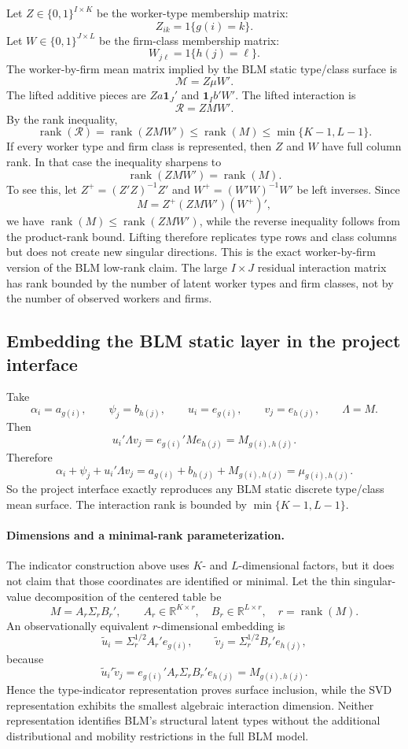 \documentclass[11pt]{article}
\newcommand{\R}{\mathbb{R}}
\newcommand{\rank}{\operatorname{rank}}
\newcommand{\one}{\mathbf{1}}
\begin{document}
Let \(Z\in\{0,1\}^{I\times K}\) be the worker-type membership matrix:
\[
Z_{ik}=1\{g(i)=k\}.
\]
Let \(W\in\{0,1\}^{J\times L}\) be the firm-class membership matrix:
\[
W_{j\ell}=1\{h(j)=\ell\}.
\]
The worker-by-firm mean matrix implied by the BLM static type/class surface is
\[
\mathcal{M}=Z\mu W'.
\tag{lifted-mean}
\]
The lifted additive pieces are \(Za\one_J'\) and \(\one_I b'W'\). The lifted
interaction is
\[
\mathcal{R}=ZMW'.
\tag{lifted-interaction}
\]
By the rank inequality,
\[
\rank(\mathcal{R})
=
\rank(ZMW')
\leq
\rank(M)
\leq
\min\{K-1,L-1\}.
\tag{lifted-rank}
\]
If every worker type and firm class is represented, then \(Z\) and \(W\) have
full column rank.  In that case the inequality sharpens to
\[
\rank(ZMW')=\rank(M).
\tag{lifted-rank-equality}
\]
To see this, let \(Z^+=(Z'Z)^{-1}Z'\) and \(W^+=(W'W)^{-1}W'\) be left
inverses.  Since
\[
M=Z^+(ZMW')(W^+)',
\]
we have \(\rank(M)\leq\rank(ZMW')\), while the reverse inequality follows
from the product-rank bound.  Lifting therefore replicates type rows and class
columns but does not create new singular directions.
This is the exact worker-by-firm version of the BLM low-rank claim. The large
\(I\times J\) residual interaction matrix has rank bounded by the number of
latent worker types and firm classes, not by the number of observed workers and
firms.

\subsection{Embedding the BLM static layer in the project interface}

Take
\[
\alpha_i=a_{g(i)},
\qquad
\psi_j=b_{h(j)},
\qquad
u_i=e_{g(i)},
\qquad
v_j=e_{h(j)},
\qquad
\Lambda=M.
\]
Then
\[
u_i'\Lambda v_j
=
e_{g(i)}'M e_{h(j)}
=
M_{g(i),h(j)}.
\]
Therefore
\[
\alpha_i+\psi_j+u_i'\Lambda v_j
=
a_{g(i)}+b_{h(j)}+M_{g(i),h(j)}
=
\mu_{g(i),h(j)}.
\]
So the project interface exactly reproduces any BLM static discrete
type/class mean surface. The interaction rank is bounded by
\(\min\{K-1,L-1\}\).

\paragraph{Dimensions and a minimal-rank parameterization.}
The indicator construction above uses \(K\)- and \(L\)-dimensional factors,
but it does not claim that those coordinates are identified or minimal.  Let
the thin singular-value decomposition of the centered table be
\[
M=A_r\Sigma_r B_r',
\qquad
A_r\in\R^{K\times r},
\quad
B_r\in\R^{L\times r},
\quad
r=\rank(M).
\]
An observationally equivalent \(r\)-dimensional embedding is
\[
\widetilde u_i=\Sigma_r^{1/2}A_r'e_{g(i)},
\qquad
\widetilde v_j=\Sigma_r^{1/2}B_r'e_{h(j)},
\]
because
\[
\widetilde u_i'\widetilde v_j
=e_{g(i)}'A_r\Sigma_rB_r'e_{h(j)}
=M_{g(i),h(j)}.
\]
Hence the type-indicator representation proves surface inclusion, while the
SVD representation exhibits the smallest algebraic interaction dimension.
Neither representation identifies BLM's structural latent types without the
additional distributional and mobility restrictions in the full BLM model.
\end{document}
